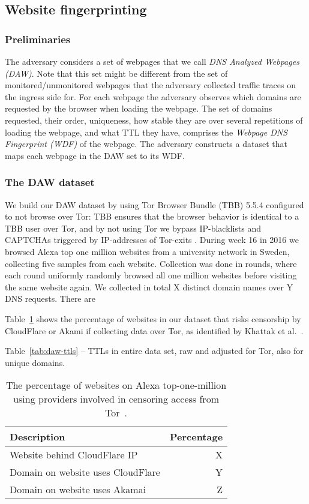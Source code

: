 \subsection{Website fingerprinting}

\subsubsection{Preliminaries}
The adversary considers a set of webpages that we call \emph{DNS
Analyzed Webpages (DAW)}. Note that this set might be different from the
set of monitored/unmonitored webpages that the adversary collected
traffic traces on the ingress side for.
For each webpage the adversary observes which domains are requested by
the browser when loading the webpage. The set of domains requested,
their order, uniqueness, how stable they are over several repetitions of
loading the webpage, and what TTL they have, comprises the
\emph{Webpage DNS Fingerprint (WDF)} of the webpage.
The adversary constructs a dataset that maps each webpage in the DAW set
to its WDF.

\subsubsection{The DAW dataset}
We build our DAW dataset by using Tor Browser Bundle (TBB) 5.5.4
configured to not browse over Tor: TBB ensures that the browser behavior is
identical to a TBB user over Tor, and by not using Tor we bypass IP-blacklists
and CAPTCHAs triggered by IP-addresses of Tor-exits \cite{Khattak2016a}.
During week 16 in 2016 we browsed Alexa top one million websites from a
university network in Sweden, collecting five samples from each website.
Collection was done in rounds, where each round uniformly randomly browsed all one
million websites before visiting the same website again. We collected in total
X distinct domain names over Y DNS requests. There are

Table~\ref{tab:dns-censor} shows the percentage of websites in our dataset that
risks censorship by CloudFlare or Akami if collecting data over Tor, as
identified by Khattak et al.~\cite{Khattak2016a}.

Table~\ref{tab:daw-ttls} -- TTLs in entire data set, raw and adjusted for Tor,
also for unique domains.

\begin{table}[t]
	\centering
	\begin{tabular}{l r}
	\toprule
	\textbf{Description} & \textbf{Percentage} \\
	\midrule
	Website behind CloudFlare IP & X \\
	Domain on website uses CloudFlare & Y \\
	Domain on website uses Akamai & Z \\
	\bottomrule
	\end{tabular}
	\caption{The percentage of websites on Alexa top-one-million using providers
	involved in censoring access from Tor~\cite{Khattak2016a}.}
	\label{tab:dns-censor}
\end{table}

